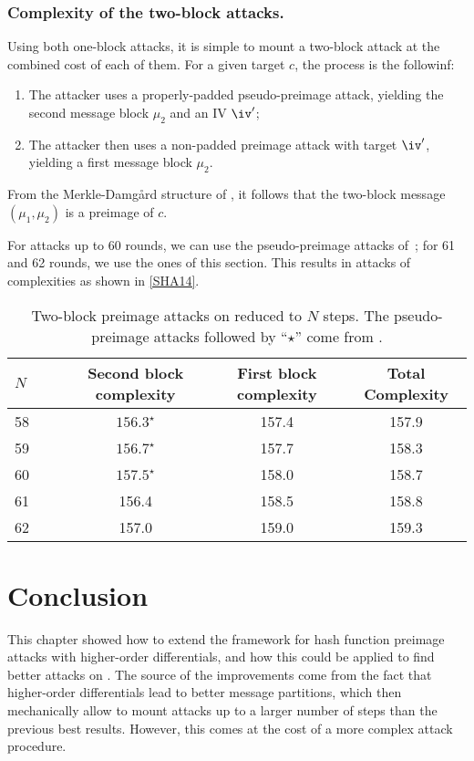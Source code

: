   \subsubsection{Complexity of the two-block attacks.}
  Using both one-block attacks, it is simple to mount a two-block attack at the combined cost of each of them.
  For a given target $c$, the process is the followinf:
    \begin{enumerate}
      \item The attacker uses a properly-padded pseudo-preimage attack, yielding the second message block $\mu_2$ and an IV $\iv'$;
      \item The attacker then uses a non-padded preimage attack with target $\iv'$, yielding a first message block $\mu_2$.
    \end{enumerate}
From the Merkle-Damg\aa rd structure of \shaone, it follows that the two-block message $(\mu_1, \mu_2)$ 
    is a preimage of $c$.

    For attacks up to 60 rounds, we can use the pseudo-preimage attacks of~\cite{DBLP:conf/crypto/KnellwolfK12}; for 61 and 62 rounds,
    we use the ones of this section. This results in attacks of complexities as shown in \autoref{SHA14}.

  \begin{table}[t]
    \caption[Two-block preimage.]{Two-block preimage attacks on \shaone reduced to $N$ steps. The pseudo-preimage attacks followed by
    ``$\star$'' come from \cite{DBLP:conf/crypto/KnellwolfK12}.\label{SHA14}}
    \begin{center}
      \begin{tabular}{l c c c } \toprule
        $N\qquad$ & Second block complexity\phantom{bla} & First block complexity\phantom{bla}  & Total Complexity \\\midrule
        58    & $156.3^\star$ & 157.4& 157.9\\ 
        59    & $156.7^\star$ & 157.7& 158.3\\ 
        60    & $157.5^\star$ & 158.0& 158.7\\ 
        61    & 156.4    & 158.5& 158.8\\ 
        62    & 157.0    & 159.0& 159.3\\ 
        \bottomrule
        \hline
      \end{tabular}
    \end{center}
  \end{table}

\section{Conclusion}
This chapter showed how to extend the \mitm framework for hash function preimage attacks with higher-order differentials,
and how this could be applied to find better attacks on \shaone.
The source of the improvements come from the fact that higher-order differentials lead to better message partitions, which
then mechanically allow to mount attacks up to a larger number of steps than the previous best
results. However, this comes at the cost of a more complex attack procedure.
